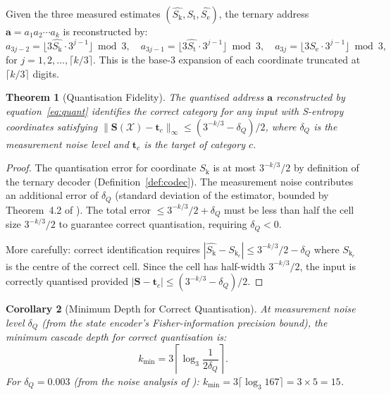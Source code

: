\documentclass[11pt,twocolumn,a4paper]{article}
\newtheorem{theorem}{Theorem}[section]
\newtheorem{corollary}[theorem]{Corollary}
\theoremstyle{definition}
\theoremstyle{remark}
\newcommand{\Sk}{S_{\mathrm{k}}}
\newcommand{\St}{S_{\mathrm{t}}}
\newcommand{\Se}{S_{\mathrm{e}}}
\newcommand{\Sent}{\bm{S}}
\begin{document}
Given the three measured estimates $(\hat{\Sk}, \hat{\St}, \hat{\Se})$,
the ternary address $\mathbf{a} = a_1 a_2 \cdots a_k$ is reconstructed by:
\begin{equation}
a_{3j-2} = \lfloor 3 \hat{\Sk} \cdot 3^{j-1} \rfloor \bmod 3, \quad
a_{3j-1} = \lfloor 3 \hat{\St} \cdot 3^{j-1} \rfloor \bmod 3, \quad
a_{3j} = \lfloor 3 \hat{\Se} \cdot 3^{j-1} \rfloor \bmod 3,
\label{eq:quant}
\end{equation}
for $j = 1, 2, \ldots, \lceil k/3 \rceil$. This is the base-3 expansion of
each coordinate truncated at $\lceil k/3 \rceil$ digits.

\begin{theorem}[Quantisation Fidelity]
\label{thm:quantfid}
The quantised address $\mathbf{a}$ reconstructed by equation~\eqref{eq:quant}
identifies the correct category for any input with S-entropy coordinates
satisfying $\|\Sent(\mathcal{X}) - \mathbf{t}_c\|_\infty \leq (3^{-k/3} - \delta_Q)/2$,
where $\delta_Q$ is the measurement noise level and $\mathbf{t}_c$ is the
target of category $c$.
\end{theorem}

\begin{proof}
The quantisation error for coordinate $\Sk$ is at most $3^{-k/3}/2$ by definition
of the ternary decoder (Definition~\ref{def:codec}). The measurement noise
contributes an additional error of $\delta_Q$ (standard deviation of the
estimator, bounded by Theorem~4.2 of \citep{companion2}). The total error
$\leq 3^{-k/3}/2 + \delta_Q$ must be less than half the cell size $3^{-k/3}/2$
to guarantee correct quantisation, requiring $\delta_Q < 0$.

More carefully: correct identification requires $|\hat{\Sk} - \Sk_c| \leq
3^{-k/3}/2 - \delta_Q$ where $\Sk_c$ is the centre of the correct cell.
Since the cell has half-width $3^{-k/3}/2$, the input is correctly quantised
provided $|\Sent - \mathbf{t}_c| \leq (3^{-k/3} - \delta_Q)/2$.
\end{proof}

\begin{corollary}[Minimum Depth for Correct Quantisation]
\label{cor:mindepth}
At measurement noise level $\delta_Q$ (from the state encoder's Fisher-information
precision bound), the minimum cascade depth for correct quantisation is:
\begin{equation}
k_{\min} = 3 \left\lceil \log_3 \frac{1}{2\delta_Q} \right\rceil.
\label{eq:kmin}
\end{equation}
For $\delta_Q = 0.003$ (from the noise analysis of \citep{companion2}):
$k_{\min} = 3\lceil \log_3 167 \rceil = 3 \times 5 = 15$.
\end{corollary}
\end{document}
